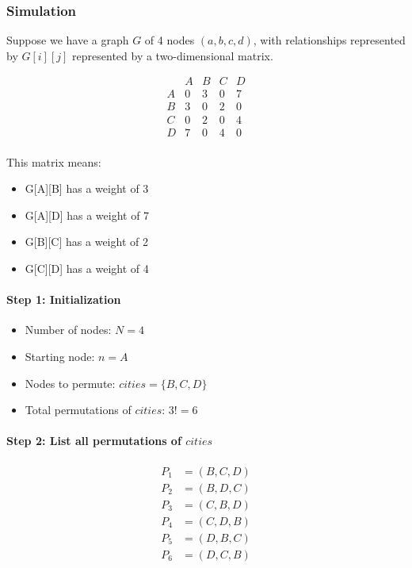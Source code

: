 \pagebreak
\subsubsection{Simulation}

Suppose we have a graph $G$ of 4 nodes $(a,b,c,d)$, with relationships represented by $G[i][j]$ represented by a two-dimensional matrix.

\[
\begin{array}{c|cccc}
  & A & B & C & D \\
\hline
A & 0 & 3 & 0 & 7 \\
B & 3 & 0 & 2 & 0 \\
C & 0 & 2 & 0 & 4 \\
D & 7 & 0 & 4 & 0 \\
\end{array}
\]

This matrix means:
\begin{itemize}
    \item G[A][B] has a weight of 3
    \item G[A][D] has a weight of 7
    \item G[B][C] has a weight of 2
    \item G[C][D] has a weight of 4
\end{itemize}


\paragraph{Step 1: Initialization}

\begin{itemize}
    \item Number of nodes: $N = 4$
    \item Starting node: $n = A$
    \item Nodes to permute: $cities = \{B, C, D\}$
    \item Total permutations of $cities$: $3! = 6$
\end{itemize}

\paragraph{Step 2: List all permutations of $cities$}

\[
\begin{aligned}
P_1 &= (B, C, D) \\
P_2 &= (B, D, C) \\
P_3 &= (C, B, D) \\
P_4 &= (C, D, B) \\
P_5 &= (D, B, C) \\
P_6 &= (D, C, B)
\end{aligned}
\]

